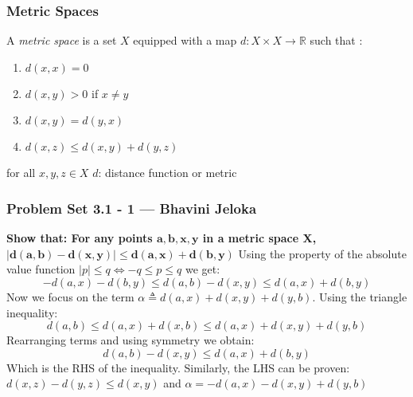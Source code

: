 \begin{frame}
    \frametitle{Metric Spaces}
A \textit{metric space} is a set $X$ equipped with a map $d: X\times X
\rightarrow \mathbb{R}$ such that :
\begin{enumerate}
    \item $d(x,x) = 0$
    \item $d(x,y)>0$ if $x\neq y$
    \item $d(x,y) = d(y,x)$
    \item $d(x,z) \leq d(x,y)+d(y,z)$
\end{enumerate}
    
for all $x,y,z \in X$ \hfill\break
\hfill\break
$d$: distance function or metric
\end{frame}

\begin{frame}
\frametitle{Problem Set 3.1 - 1 --- Bhavini Jeloka}
\textbf{Show that: For any points $\bm{a,b,x,y}$ in a metric space X,}
$\bm{|d(a,b) - d(x,y)| \leq d(a,x) + d(b,y)}$\hfill\break
\hfill\break
Using the property of the absolute value function $|p|\leq q \iff -q\leq p \leq
q$ we get:\hfill\break
\begin{equation*}
- d(a,x) - d(b,y) \leq d(a,b) - d(x,y) \leq  d(a,x) + d(b,y)
\end{equation*}
\hfill\break
Now we focus on the term $\alpha \triangleq d(a,x) + d(x, y)  + d(y, b)$.
Using the triangle inequality:
\begin{equation*}
d(a,b) \leq d(a,x) + d(x, b) \leq  d(a,x) + d(x, y)  + d(y, b) 
\end{equation*}
Rearranging terms and using symmetry we obtain:
\begin{equation*}
d(a,b) - d(x,y) \leq  d(a,x) + d(b,y)
\end{equation*}
Which is the RHS of the inequality. Similarly, the LHS can be proven: $d(x,z)
- d(y,z) \leq d(x,y)$ and $\alpha = -d(a,x) -d(x, y)  + d(y, b)$
\end{frame}

